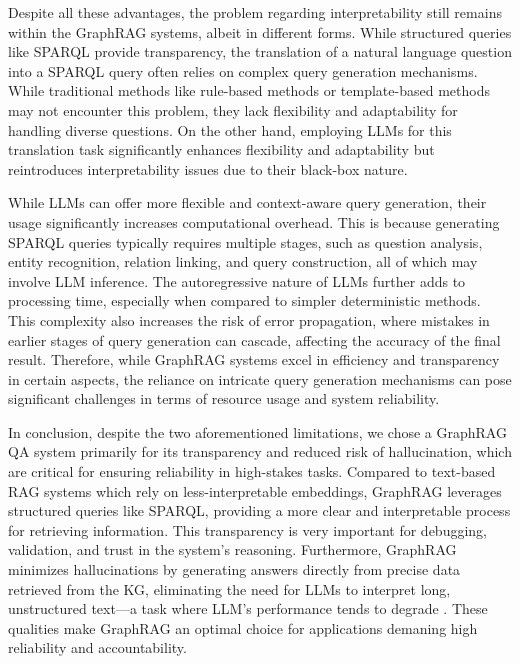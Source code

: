 Despite all these advantages, the problem regarding interpretability
still remains within the GraphRAG systems, albeit in different forms.
While structured queries like SPARQL provide transparency, the translation
of a natural language question into a SPARQL query often relies on
complex query generation mechanisms. While traditional methods like rule-based
methods or template-based methods may not encounter this problem,
they lack flexibility and adaptability for handling diverse questions. 
On the other hand, employing LLMs for this translation task significantly 
enhances flexibility and adaptability but reintroduces interpretability 
issues due to their black-box nature.

While LLMs can offer more flexible and context-aware query generation, 
their usage significantly increases computational overhead. This is 
because generating SPARQL queries typically requires multiple stages, 
such as question analysis, entity recognition, relation linking, and 
query construction, all of which may involve LLM inference. The 
autoregressive nature of LLMs further adds to processing time, 
especially when compared to simpler deterministic methods. 
This complexity also increases the risk of error propagation, where 
mistakes in earlier stages of query generation can cascade, 
affecting the accuracy of the final result. 
Therefore, while GraphRAG systems excel in efficiency and 
transparency in certain aspects, the reliance on intricate 
query generation mechanisms can pose significant challenges in 
terms of resource usage and system reliability.

In conclusion, despite the two aforementioned limitations, we chose
a GraphRAG QA system primarily for its transparency and
reduced risk of hallucination, which are critical for ensuring reliability
in high-stakes tasks. Compared to text-based RAG systems which rely on
less-interpretable embeddings, GraphRAG leverages structured queries like
SPARQL, providing a more clear and interpretable process for retrieving
information. This transparency is very important for debugging, 
validation, and trust in the system's reasoning. Furthermore, GraphRAG
minimizes hallucinations by generating answers directly from precise 
data retrieved from the KG, eliminating the need for LLMs to interpret long,
unstructured text---a task where LLM's performance tends to degrade
\citep{hosseini2024efficientsolutionsintriguingfailure}.
These qualities make GraphRAG an optimal choice for applications
demaning high reliability and accountability.

